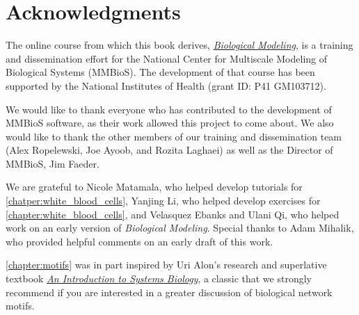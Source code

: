 
\newpage


 
\clearpage
{}
\chapter{Acknowledgments}
\label{chapter:acknowledgments}

The online course from which this book derives, \href{https://biologicalmodeling.org}{\textit{Biological Modeling}}, is a training and dissemination effort for the National Center for Multiscale Modeling of Biological Systems (MMBioS). The development of that course has been supported by the National Institutes of Health (grant ID: P41 GM103712).

We would like to thank everyone who has contributed to the development of MMBioS software, as their work allowed this project to come about. We also would like to thank the other members of our training and dissemination team (Alex Ropelewski, Joe Ayoob, and Rozita Laghaei) as well as the Director of MMBioS, Jim Faeder.

We are grateful to Nicole Matamala, who helped develop tutorials for \autoref{chatper:white_blood_cells}, Yanjing Li, who helped develop exercises for \autoref{chapter:white_blood_cells}, and Velasquez Ebanks and Ulani Qi, who helped work on an early version of \textit{Biological Modeling}. Special thanks to Adam Mihalik, who provided helpful comments on an early draft of this work.

\autoref{chapter:motifs} was in part inspired by Uri Alon’s research and superlative textbook \href{https://www.weizmann.ac.il/mcb/UriAlon/introduction-systems-biology-design-principles-biological-circuits}{\textit{An Introduction to Systems Biology}}, a classic that we strongly recommend if you are interested in a greater discussion of biological network motifs.

